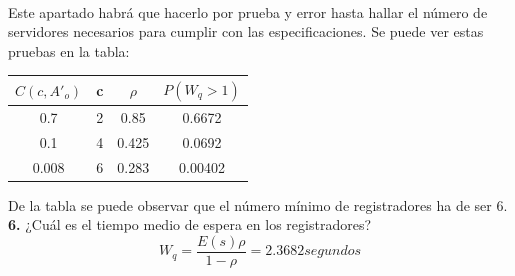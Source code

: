 \begin{exercise}[5]
\begin{gather*}
\end{gather*}
Este apartado habrá que hacerlo por prueba y error hasta hallar el número de servidores necesarios para cumplir con las especificaciones. Se puede ver estas pruebas en la tabla:\\
\begin{center}
\begin{tabular}{c | c | c | c}
$C(c,A'_o)$ & c & $\rho$ & $P(W_q>1)$ \\\hline
0.7  & 2 & 0.85  & 0.6672 \\
0.1  & 4 & 0.425 & 0.0692 \\
0.008 & 6 & 0.283 & 0.00402
\end{tabular}
\end{center} 
De la tabla se puede observar que el número mínimo de registradores ha de ser 6.\\
\textbf{6.} ¿Cuál es el tiempo medio de espera en los registradores?\\
\[W_q=\frac{E(s)\rho}{1-\rho}=2.3682segundos\]
\end{exercise}
